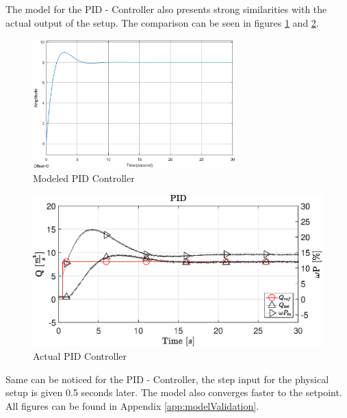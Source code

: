 The model for the PID - Controller also presents strong similarities with the actual output of the setup.
The comparison can be seen in figures \ref{fig:modeledPID2} and \ref{fig:actualPID2}.
\begin{figure}[H]
	\centering
	\includegraphics[width=0.7\textwidth]{figures/06ModelValidation/modelPID.eps}
	\caption{Modeled PID Controller}
	\label{fig:modeledPID2}
\end{figure}
\vspace{-5mm}
\begin{figure}[H]
    \centering
    \includegraphics[width=\textwidth]{figures/07controllerDesign/PIDtest.eps}
    \caption{Actual PID Controller}
	\label{fig:actualPID2}
\end{figure}
Same can be noticed for the PID - Controller, the step input for the physical setup is given 0.5 seconds later.
The model also converges faster to the setpoint.
All figures can be found in Appendix  \ref{app:modelValidation}.